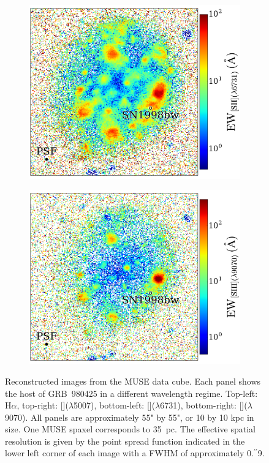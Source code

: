 \documentclass[traditabstract]{aa}
\newcommand{\farc}{\hbox{$.\!\!^{\prime\prime}$}}
\newcommand{\ha}{H$\alpha$}
\newcommand{\sii}{[\ion{S}{ii}]}
\newcommand{\siii}{[\ion{S}{iii}]}
\newcommand{\oiii}{[\ion{O}{iii}]}
\begin{document}
\begin{figure}
\begin{subfigure}{.242\textwidth}
\end{subfigure}
\begin{subfigure}{.243\textwidth}
  \includegraphics[width=1.0\linewidth]{Figs/MUSE_SN1998bw_SIIEW.pdf}
\end{subfigure}
\begin{subfigure}{.242\textwidth}
  \includegraphics[width=1.0\linewidth]{Figs/MUSE_SN1998bw_SIIIEW.pdf}
\end{subfigure}
\caption{Reconstructed images from the MUSE data cube. Each panel shows the host of GRB~980425 in a different wavelength regime. Top-left: \ha, top-right: \oiii($\lambda$5007), bottom-left: \sii($\lambda$6731), bottom-right: \siii($\lambda$9070). All panels are approximately 55" by 55", or 10 by 10 kpc in size. One MUSE spaxel corresponds to 35~pc. The effective spatial resolution is given by the point spread function indicated in the lower left corner of each image with a FWHM of approximately 0\farc{9}.}
\label{fig:EW}
\end{figure}
\end{document}
